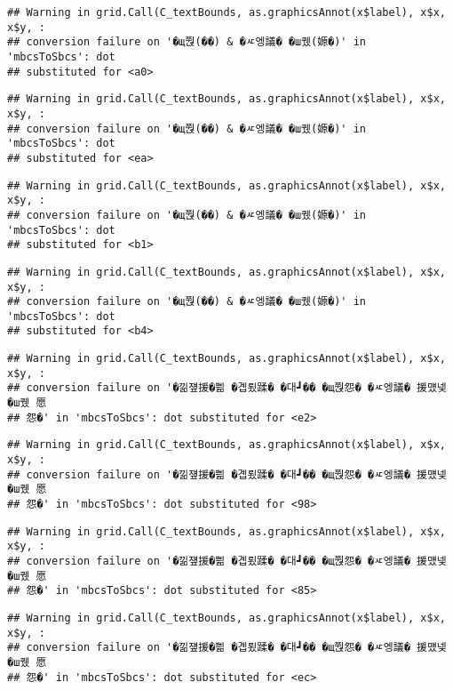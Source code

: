 \documentclass[
]{article}
\begin{document}
\begin{verbatim}
## Warning in grid.Call(C_textBounds, as.graphicsAnnot(x$label), x$x, x$y, :
## conversion failure on '�щ쭩(��) & �ㅼ엥議� �ш퀬(嫄�)' in 'mbcsToSbcs': dot
## substituted for <a0>
\end{verbatim}

\begin{verbatim}
## Warning in grid.Call(C_textBounds, as.graphicsAnnot(x$label), x$x, x$y, :
## conversion failure on '�щ쭩(��) & �ㅼ엥議� �ш퀬(嫄�)' in 'mbcsToSbcs': dot
## substituted for <ea>
\end{verbatim}

\begin{verbatim}
## Warning in grid.Call(C_textBounds, as.graphicsAnnot(x$label), x$x, x$y, :
## conversion failure on '�щ쭩(��) & �ㅼ엥議� �ш퀬(嫄�)' in 'mbcsToSbcs': dot
## substituted for <b1>
\end{verbatim}

\begin{verbatim}
## Warning in grid.Call(C_textBounds, as.graphicsAnnot(x$label), x$x, x$y, :
## conversion failure on '�щ쭩(��) & �ㅼ엥議� �ш퀬(嫄�)' in 'mbcsToSbcs': dot
## substituted for <b4>
\end{verbatim}

\begin{verbatim}
## Warning in grid.Call(C_textBounds, as.graphicsAnnot(x$label), x$x, x$y, :
## conversion failure on '�낆쟾援�쁾 �곕룄蹂� �대┛�� �щ쭩怨� �ㅼ엥議� 援먰넻�ш퀬 愿
## 怨�' in 'mbcsToSbcs': dot substituted for <e2>
\end{verbatim}

\begin{verbatim}
## Warning in grid.Call(C_textBounds, as.graphicsAnnot(x$label), x$x, x$y, :
## conversion failure on '�낆쟾援�쁾 �곕룄蹂� �대┛�� �щ쭩怨� �ㅼ엥議� 援먰넻�ш퀬 愿
## 怨�' in 'mbcsToSbcs': dot substituted for <98>
\end{verbatim}

\begin{verbatim}
## Warning in grid.Call(C_textBounds, as.graphicsAnnot(x$label), x$x, x$y, :
## conversion failure on '�낆쟾援�쁾 �곕룄蹂� �대┛�� �щ쭩怨� �ㅼ엥議� 援먰넻�ш퀬 愿
## 怨�' in 'mbcsToSbcs': dot substituted for <85>
\end{verbatim}

\begin{verbatim}
## Warning in grid.Call(C_textBounds, as.graphicsAnnot(x$label), x$x, x$y, :
## conversion failure on '�낆쟾援�쁾 �곕룄蹂� �대┛�� �щ쭩怨� �ㅼ엥議� 援먰넻�ш퀬 愿
## 怨�' in 'mbcsToSbcs': dot substituted for <ec>
\end{verbatim}
\end{document}
